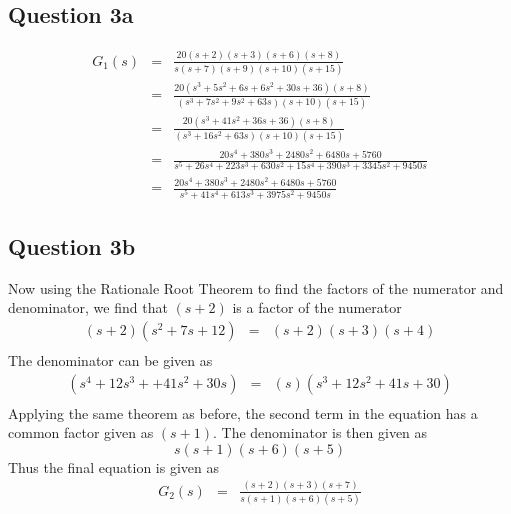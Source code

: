 \documentclass[12pt, a4paper]{article}
\begin{document}
		\subsection*{Question 3a}
		\label{sub:question_3a}
			\begin{equation}
				\begin{array}{rcl}
					G_1(s) & = & \frac{20(s+2)(s+3)(s+6)(s+8)}{s(s+7)(s+9)(s+10)(s+15)}\\
					& = & \frac{20(s^3+5s^2+6s+6s^2+30s+36)(s+8)}{(s^3+7s^2+9s^2+63s)(s+10)(s+15)}\\
					& = & \frac{20(s^3+41s^2+36s+36)(s+8)}{(s^3+16s^2+63s)(s+10)(s+15)}\\
					& = & \frac{20s^4+380s^3+2480s^2+6480s+5760}{s^5+26s^4+223s^3+630s^2+15s^4+390s^3+3345s^2+9450s}\\
					& = & \frac{20s^4+380s^3+2480s^2+6480s+5760}{s^5+41s^4+613s^3+3975s^2+9450s}
				\end{array}
			\end{equation} 

		\subsection*{Question 3b}
		\label{sub:question_3b}
			Now using the Rationale Root Theorem to find the factors of the numerator and denominator, we find that $(s+2)$ is a factor of the numerator
			\begin{equation}
				\begin{array}{rcl}
				(s+2)(s^2+7s+12) & = & (s+2)(s+3)(s+4) \\
				\end{array}
			\end{equation}
			The denominator can be given as
			\begin{equation}
				\begin{array}{rcl}
				(s^4+12s^3++41s^2+30s) & = & (s)(s^3+12s^2+41s+30) \\
				\end{array}
			\end{equation}
			Applying the same theorem as before, the second term in the equation has a common factor given as $(s+1)$. The denominator is then given as 
			\begin{equation}
					s(s+1)(s+6)(s+5)
			\end{equation}
			Thus the final equation is given as 
			\begin{equation}
				\begin{array}{rcl}
				G_2(s) & = & \frac{(s+2)(s+3)(s+7)}{s(s+1)(s+6)(s+5)}
				\end{array}
			\end{equation}
\end{document}
